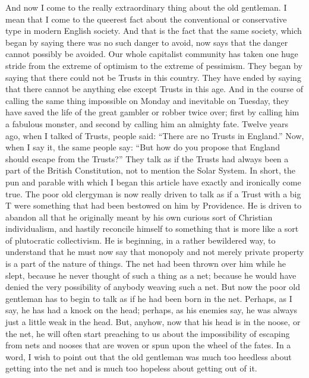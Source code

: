 \documentclass{book}
\begin{document}
And now I come to the really extraordinary thing about the old gentleman. I mean that I come to the queerest fact about the conventional or conservative type in modern English society. And that is the fact that the same society, which began by saying there was no such danger to avoid, now says that the danger cannot possibly be avoided. Our whole capitalist community has taken one huge stride from the extreme of optimism to the extreme of pessimism. They began by saying that there could not be Trusts in this country. They have ended by saying that there cannot be anything else except Trusts in this age. And in the course of calling the same thing impossible on Monday and inevitable on Tuesday, they have saved the life of the great gambler or robber twice over; first by calling him a fabulous monster, and second by calling him an almighty fate. Twelve years ago, when I talked of Trusts, people said: “There are no Trusts in England.” Now, when I say it, the same people say: “But how do you propose that England should escape from the Trusts?” They talk as if the Trusts had always been a part of the British Constitution, not to mention the Solar System. In short, the pun and parable with which I began this article have exactly and ironically come true. The poor old clergyman is now really driven to talk as if a Trust with a big T were something that had been bestowed on him by Providence. He is driven to abandon all that he originally meant by his own curious sort of Christian individualism, and hastily reconcile himself to something that is more like a sort of plutocratic collectivism. He is beginning, in a rather bewildered way, to understand that he must now say that monopoly and not merely private property is a part of the nature of things. The net had been thrown over him while he slept, because he never thought of such a thing as a net; because he would have denied the very possibility of anybody weaving such a net. But now the poor old gentleman has to begin to talk as if he had been born in the net. Perhaps, as I say, he has had a knock on the head; perhaps, as his enemies say, he was always just a little weak in the head. But, anyhow, now that his head is in the noose, or the net, he will often start preaching to us about the impossibility of escaping from nets and nooses that are woven or spun upon the wheel of the fates. In a word, I wish to point out that the old gentleman was much too heedless about getting into the net and is much too hopeless about getting out of it.
\end{document}
